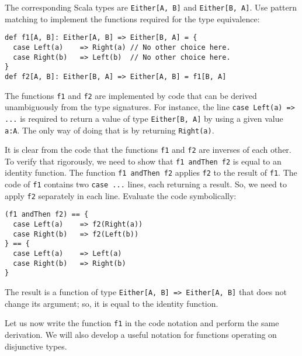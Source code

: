 The corresponding Scala types are \lstinline!Either[A, B]! and \lstinline!Either[B, A]!.
Use pattern matching to implement the functions required for the type
equivalence:
\begin{lstlisting}
def f1[A, B]: Either[A, B] => Either[B, A] = {
  case Left(a)    => Right(a) // No other choice here.
  case Right(b)   => Left(b)  // No other choice here.
}
def f2[A, B]: Either[B, A] => Either[A, B] = f1[B, A]
\end{lstlisting}
The functions \lstinline!f1! and \lstinline!f2! are implemented
by code that can be derived unambiguously from the type signatures.
For instance, the line \lstinline!case Left(a) => ...! is required
to return a value of type \lstinline!Either[B, A]! by using a given
value \lstinline!a:A!. The only way of doing that is by returning
\lstinline!Right(a)!.

It is clear from the code that the functions \lstinline!f1! and \lstinline!f2!
are inverses of each other. To verify that rigorously, we need to
show that \lstinline!f1 andThen f2! is equal to an identity function.
The function \lstinline!f1 andThen f2! applies \lstinline!f2! to
the result of \lstinline!f1!. The code of \lstinline!f1! contains
two \lstinline!case ...! lines, each returning a result. So, we need
to apply \lstinline!f2! separately in each line. Evaluate the code
symbolically:
\begin{lstlisting}
(f1 andThen f2) == {
  case Left(a)    => f2(Right(a))
  case Right(b)   => f2(Left(b))
} == {
  case Left(a)    => Left(a)
  case Right(b)   => Right(b)
}
\end{lstlisting}
The result is a function of type \lstinline!Either[A, B] => Either[A, B]!
that does not change its argument; so, it is equal to the identity
function. 

Let us now write the function \lstinline!f1! in the code notation
and perform the same derivation. We will also develop a useful notation
for functions operating on disjunctive types.

